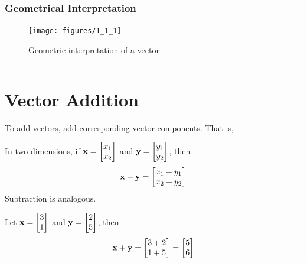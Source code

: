 \subsubsection*{Geometrical Interpretation}


 
\begin{figure}[htbp] %
   \centering

    \texttt{[image: figures/1\_1\_1]} 
  
   \caption{Geometric interpretation of a vector}
   \label{fig:vector}
\end{figure}
 


\rule[0.01in]{\textwidth}{0.0025in}



%
%
\section{Vector Addition}

To add vectors, add corresponding vector components. That is, 


\begin{tcolorbox}[colback=yellow!10!,colframe=gray!15!]
\begin{definition}
In two-dimensions, if ${\bf x} = \begin{bmatrix}
	x_1 \\ x_2
		\end{bmatrix}$ and ${\bf y} = \begin{bmatrix}
	y_1 \\ y_2
		\end{bmatrix}$, then 
		\[ \]
\[  {\bf x} + {\bf y} = \begin{bmatrix}
	x_1+y_1 \\ x_2 + y_2
		\end{bmatrix} \]
Subtraction is analogous.
  
\end{definition}	 
\end{tcolorbox} 


\begin{example}
	Let  ${\bf x} = \begin{bmatrix}
	3 \\ 1
		\end{bmatrix}$ and ${\bf y} = \begin{bmatrix}
	2 \\ 5
		\end{bmatrix}$, then 
		\[ \]
\[  {\bf x} + {\bf y} = \begin{bmatrix}
	3+2 \\ 1 + 5
		\end{bmatrix} = \begin{bmatrix}
	5 \\ 6
		\end{bmatrix} \]
\end{example}
 

